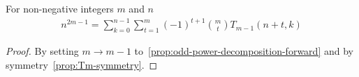 \begin{proposition}
    \label{prop:odd-power-decomposition-forward-m-1-shifted}
    For non-negative integers $m$ and $n$
    \begin{align*}
        n^{2m-1} = \sum_{k=0}^{n-1} \sum_{t=1}^{m} (-1)^{t+1} \binom{m}{t} T_{m-1} (n+t, k)
    \end{align*}
    \begin{proof}
        By setting $m \rightarrow m-1$ to~\eqref{prop:odd-power-decomposition-forward} and
        by symmetry~\eqref{prop:Tm-symmetry}.
    \end{proof}
\end{proposition}
